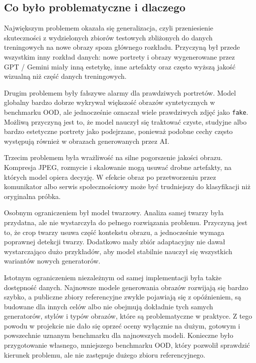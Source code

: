 \subsection{Co było problematyczne i dlaczego}

Największym problemem okazała się generalizacja, czyli przeniesienie skuteczności z wydzielonych zbiorów testowych zbliżonych do danych treningowych na nowe obrazy spoza głównego rozkładu. Przyczyną był przede wszystkim inny rozkład danych: nowe portrety i obrazy wygenerowane przez GPT / Gemini miały inną estetykę, inne artefakty oraz często wyższą jakość wizualną niż część danych treningowych.

Drugim problemem były fałszywe alarmy dla prawdziwych portretów. Model globalny bardzo dobrze wykrywał większość obrazów syntetycznych w benchmarku OOD, ale jednocześnie oznaczał wiele prawdziwych zdjęć jako \texttt{fake}. Możliwą przyczyną jest to, że model nauczył się traktować czyste, studyjne albo bardzo estetyczne portrety jako podejrzane, ponieważ podobne cechy często występują również w obrazach generowanych przez AI.

Trzecim problemem była wrażliwość na silne pogorszenie jakości obrazu. Kompresja JPEG, rozmycie i skalowanie mogą usuwać drobne artefakty, na których model opiera decyzję. W efekcie obraz po przetworzeniu przez komunikator albo serwis społecznościowy może być trudniejszy do klasyfikacji niż oryginalna próbka.

Osobnym ograniczeniem był model twarzowy. Analiza samej twarzy była przydatna, ale nie wystarczyła do pełnego rozwiązania problemu. Przyczyną jest to, że crop twarzy usuwa część kontekstu obrazu, a jednocześnie wymaga poprawnej detekcji twarzy. Dodatkowo mały zbiór adaptacyjny nie dawał wystarczająco dużo przykładów, aby model stabilnie nauczył się wszystkich wariantów nowych generatorów.

Istotnym ograniczeniem niezależnym od samej implementacji była także dostępność danych. Najnowsze modele generowania obrazów rozwijają się bardzo szybko, a publiczne zbiory referencyjne zwykle pojawiają się z opóźnieniem, są budowane dla innych celów albo nie obejmują dokładnie tych samych generatorów, stylów i typów obrazów, które są problematyczne w praktyce. Z tego powodu w projekcie nie dało się oprzeć oceny wyłącznie na dużym, gotowym i powszechnie uznanym benchmarku dla najnowszych modeli. Konieczne było przygotowanie własnego, mniejszego benchmarku OOD, który pozwolił sprawdzić kierunek problemu, ale nie zastępuje dużego zbioru referencyjnego.

